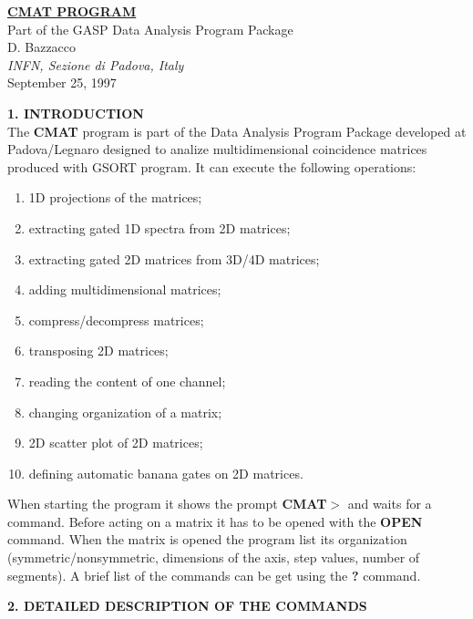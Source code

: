 \textwidth15cm
\parindent1cm


\begin{center}
{\Large\bf\underline{CMAT PROGRAM}} \\
\bigskip
Part of the GASP Data Analysis Program Package\\
\bigskip
\bigskip
{D. Bazzacco} \\
\bigskip
{\small\it INFN, Sezione di Padova, Italy}\\
\bigskip
September 25, 1997
\end{center}

\bigskip
\bigskip
\bigskip

\noindent
{\large\bf 1. INTRODUCTION} \\

\bigskip
The {\bf CMAT} program is part of the Data Analysis Program Package developed
at Padova/Legnaro designed to analize multidimensional coincidence matrices
produced with GSORT program. 
It can execute the following operations:
\begin{enumerate}
\item 1D projections of the matrices;
\item extracting gated 1D spectra from 2D matrices;
\item extracting gated 2D matrices from 3D/4D matrices;
\item adding multidimensional matrices;
\item compress/decompress matrices;
\item transposing 2D matrices;
\item reading the content of one channel;
\item changing organization of a matrix;
\item 2D scatter plot of 2D matrices;
\item defining automatic banana gates on 2D matrices.
\end{enumerate}

When starting the program it shows the prompt {\bf CMAT$>$} and waits for a
command. Before acting on a matrix it has to be opened with the {\bf
OPEN} command. When the matrix is opened the program list its organization
(symmetric/nonsymmetric, dimensions of the axis, step values, number of
segments). A brief list of the commands can be get using the {\bf ?} command. 

\newpage
\noindent
{\large\bf 2. DETAILED DESCRIPTION OF THE COMMANDS} \\


